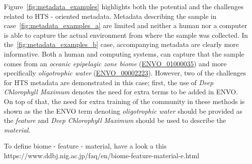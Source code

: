       Figure~\ref{fig:metadata_examples} highlights both the potential and the 
      challenges related to HTS - oriented metadata. 
      Metadata describing the sample in case~\ref{fig:metadata_examples_a}
      are limited and neither a human nor a computer is able to 
      capture the actual environment from where the sample was collected. 
      In the~\ref{fig:metadata_examples_b} case, accompanying metadata are clearly
      more informative.
      Both a human and computing systems, can capture that the sample comes from 
      an \textit{oceanic epipelagic zone biome} (\href{http://purl.obolibrary.org/obo/ENVO_01000035}{ENVO\_01000035})
      and more specifically
      \textit{oligotrophic water} (\href{http://purl.obolibrary.org/obo/ENVO_00002223}{ENVO\_00002223}).
      However, two of the challenges for HTS metadata are demonstrated in this case;
      first, the use of \textit{Deep Chlorophyll Maximum} 
      denotes the need for extra terms to be added in ENVO.  
      On top of that, the need for extra training of the community in these methods
      is shown as the the ENVO term denoting \textit{oligotrophic water} 
      should be provided as the \textit{feature} 
      and \textit{Deep Chlorophyll Maximum} should be used to 
      describe the \textit{material}.


      To define biome - feature - material, have a look a this
      https://www.ddbj.nig.ac.jp/faq/en/biome-feature-material-e.html
      \fi
      
